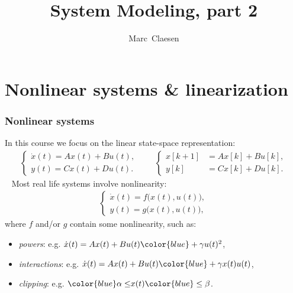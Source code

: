 \documentclass{beamer}
\title{System Modeling, part 2}
\author{Marc~Claesen}
\begin{document}

\begin{frame}
\titlepage
\end{frame}

\begin{frame}
\tableofcontents
\end{frame}

\section{Nonlinear systems \& linearization}
\begin{frame}
\frametitle{Nonlinear systems}
In this course we focus on the linear state-space representation:
\begin{align*}
\left\{ \begin{matrix} 
\dot{x}(t) = A x(t) + B u(t), \\ 
y(t) = C x(t) + D u(t).
\end{matrix}\right.\quad\quad
\left\{ \begin{matrix} 
x[k+1] &= A x[k] + B u[k], \\ 
y[k] &= C x[k] + D u[k].
\end{matrix}\right.
\end{align*}
\pause
\ \newline
Most real life systems involve nonlinearity:
\begin{align*}
\left\{ \begin{matrix} 
\dot{x}(t) = f\big(x(t), u(t)\big), \\ 
y(t) = g\big(x(t), u(t)\big),
\end{matrix}\right.
\end{align*}
\pause
where $f$ and/or $g$ contain some nonlinearity, such as:
\pause
\begin{itemize}
\item \emph{powers}: e.g. $\dot{x}(t) = A x(t) + B u(t) {\color{blue}+ \gamma u(t)^2}$,
\pause
\item \emph{interactions}: e.g. $\dot{x}(t) = A x(t) + B u(t) {\color{blue}+ \gamma x(t) u(t)}$,
\pause
\item \emph{clipping}: e.g. ${\color{blue}\alpha \leq }x(t){\color{blue}\leq \beta}$.
\end{itemize}
\end{frame}
\end{document}
